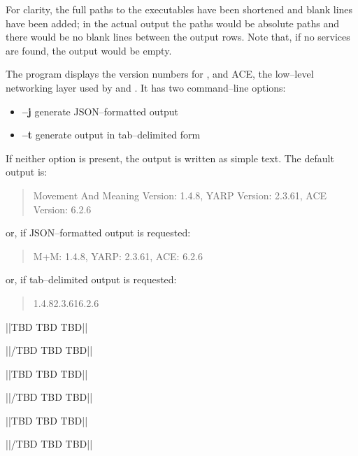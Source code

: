 For clarity, the full paths to the executables have been shortened and blank lines have
been added; in the actual output the paths would be absolute paths and there would be no
blank lines between the output rows.
Note that, if no services are found, the output would be empty.



The program  displays the version numbers for \mplusm{}, \yarp{}
and ACE, the low--level networking layer used by \mplusm{} and \yarp{}.
It has two command--line options:
\begin{itemize}
\item \textbf{--j} generate JSON--formatted output
\item \textbf{--t} generate output in tab--delimited form
\end{itemize}

If neither option is present, the output is written as simple text.
The default output is:
\begin{quote}
Movement And Meaning Version: 1.4.8, YARP Version: 2.3.61, ACE Version: 6.2.6
\end{quote}
or, if JSON--formatted output is requested:
\begin{quote}
\textbraceleft{} \dquote{}M+M\dquote{}: \dquote{}1.4.8\dquote{}, \dquote{}YARP\dquote{}:
 \dquote{}2.3.61\dquote{}, \dquote{}ACE\dquote{}: \dquote{}6.2.6\dquote{}
 \textbraceright{}
\end{quote}
or, if tab--delimited output is requested:
\begin{quote}
1.4.8\pseudotab{}2.3.61\pseudotab{}6.2.6
\end{quote}


\secondaryEnd{}

\newpage


			||TBD TBD TBD||

			||/TBD TBD TBD||


			||TBD TBD TBD||

			||/TBD TBD TBD||



			||TBD TBD TBD||

			||/TBD TBD TBD||


\secondaryEnd{}

\primaryEnd{}
